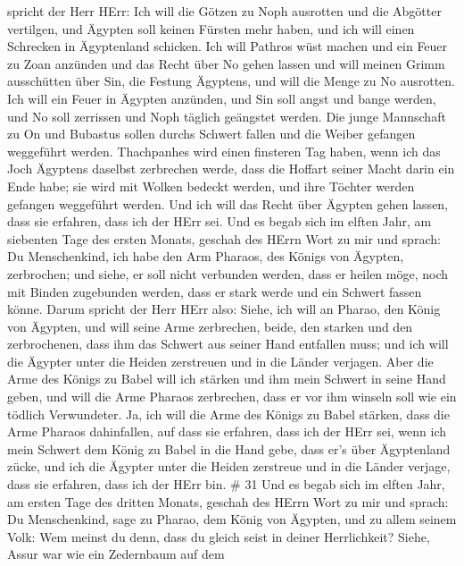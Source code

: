 spricht der Herr HErr: Ich will die Götzen zu Noph ausrotten und die
Abgötter vertilgen, und Ägypten soll keinen Fürsten mehr haben, und ich
will einen Schrecken in Ägyptenland schicken.  Ich will
Pathros wüst machen und ein Feuer zu Zoan anzünden und das Recht über No
gehen lassen  und will meinen Grimm ausschütten über Sin,
die Festung Ägyptens, und will die Menge zu No ausrotten. 
Ich will ein Feuer in Ägypten anzünden, und Sin soll angst und bange
werden, und No soll zerrissen und Noph täglich geängstet werden.
 Die junge Mannschaft zu On und Bubastus sollen durchs
Schwert fallen und die Weiber gefangen weggeführt werden. 
Thachpanhes wird einen finsteren Tag haben, wenn ich das Joch Ägyptens
daselbst zerbrechen werde, dass die Hoffart seiner Macht darin ein Ende
habe; sie wird mit Wolken bedeckt werden, und ihre Töchter werden
gefangen weggeführt werden.  Und ich will das Recht über
Ägypten gehen lassen, dass sie erfahren, dass ich der HErr sei.
 Und es begab sich im elften Jahr, am siebenten Tage des
ersten Monats, geschah des HErrn Wort zu mir und sprach: 
Du Menschenkind, ich habe den Arm Pharaos, des Königs von Ägypten,
zerbrochen; und siehe, er soll nicht verbunden werden, dass er heilen
möge, noch mit Binden zugebunden werden, dass er stark werde und ein
Schwert fassen könne.  Darum spricht der Herr HErr also:
Siehe, ich will an Pharao, den König von Ägypten, und will seine Arme
zerbrechen, beide, den starken und den zerbrochenen, dass ihm das
Schwert aus seiner Hand entfallen muss;  und ich will die
Ägypter unter die Heiden zerstreuen und in die Länder verjagen.
 Aber die Arme des Königs zu Babel will ich stärken und ihm
mein Schwert in seine Hand geben, und will die Arme Pharaos zerbrechen,
dass er vor ihm winseln soll wie ein tödlich Verwundeter. 
Ja, ich will die Arme des Königs zu Babel stärken, dass die Arme Pharaos
dahinfallen, auf dass sie erfahren, dass ich der HErr sei, wenn ich mein
Schwert dem König zu Babel in die Hand gebe, dass er's über Ägyptenland
zücke,  und ich die Ägypter unter die Heiden zerstreue und
in die Länder verjage, dass sie erfahren, dass ich der HErr bin. \# 31
 Und es begab sich im elften Jahr, am ersten Tage des
dritten Monats, geschah des HErrn Wort zu mir und sprach: 
Du Menschenkind, sage zu Pharao, dem König von Ägypten, und zu allem
seinem Volk: Wem meinst du denn, dass du gleich seist in deiner
Herrlichkeit?  Siehe, Assur war wie ein Zedernbaum auf dem
